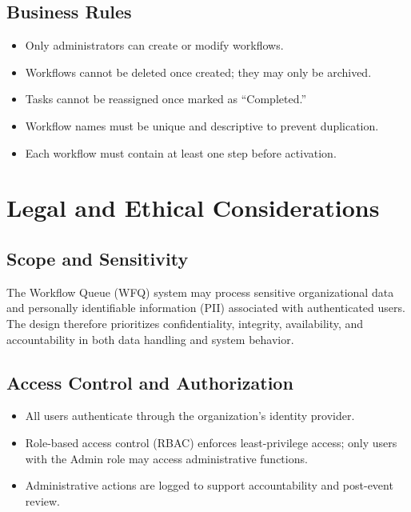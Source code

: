 \documentclass[12pt]{article}
\begin{document}
\subsection{Business Rules}
\begin{itemize}
    \item Only administrators can create or modify workflows.
    \item Workflows cannot be deleted once created; they may only be archived.
    \item Tasks cannot be reassigned once marked as ``Completed.''
    \item Workflow names must be unique and descriptive to prevent duplication.
    \item Each workflow must contain at least one step before activation.
\end{itemize}

\section{Legal and Ethical Considerations}

\subsection{Scope and Sensitivity}
The Workflow Queue (WFQ) system may process sensitive organizational data and personally
identifiable information (PII) associated with authenticated users. The design therefore
prioritizes confidentiality, integrity, availability, and accountability in both data handling
and system behavior.

\subsection{Access Control and Authorization}
\begin{itemize}
    \item All users authenticate through the organization's identity provider.
    \item Role-based access control (RBAC) enforces least-privilege access; only users with
    the Admin role may access administrative functions.
    \item Administrative actions are logged to support accountability and post-event review.
\end{itemize}
\end{document}
